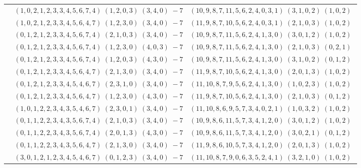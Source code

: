 \documentclass[11pt]{article}
\begin{document}
\begin{longtable}[l]{|c|c|c|}
 \cline{2-3} 
 & $(1 ,0 ,2 ,1 ,2 ,3 ,3 ,4 ,5 ,6 ,7 ,4) \;(1 ,2 ,0 ,3) \;(3 ,4 ,0) \;-7$ & $(10 ,9 ,8 ,7 ,11 ,5 ,6 ,2 ,4 ,0 ,3 ,1) \;(3 ,1 ,0 ,2) \;(1 ,0 ,2) \;$\\ 
 \cline{2-3} 
 & $(1 ,0 ,2 ,1 ,2 ,3 ,3 ,4 ,5 ,6 ,4 ,7) \;(1 ,2 ,3 ,0) \;(3 ,4 ,0) \;-7$ & $(11 ,9 ,8 ,7 ,10 ,5 ,6 ,2 ,4 ,0 ,3 ,1) \;(2 ,1 ,0 ,3) \;(1 ,0 ,2) \;$\\ 
 \cline{2-3} 
 & $(0 ,1 ,2 ,1 ,2 ,3 ,3 ,4 ,5 ,6 ,7 ,4) \;(2 ,1 ,0 ,3) \;(3 ,4 ,0) \;-7$ & $(10 ,9 ,8 ,7 ,11 ,5 ,6 ,2 ,4 ,1 ,3 ,0) \;(3 ,0 ,1 ,2) \;(1 ,0 ,2) \;$\\ 
 \cline{2-3} 
 & $(0 ,1 ,2 ,1 ,2 ,3 ,3 ,4 ,5 ,6 ,7 ,4) \;(1 ,2 ,3 ,0) \;(4 ,0 ,3) \;-7$ & $(10 ,9 ,8 ,7 ,11 ,5 ,6 ,2 ,4 ,1 ,3 ,0) \;(2 ,1 ,0 ,3) \;(0 ,2 ,1) \;$\\ 
 \cline{2-3} 
 & $(0 ,1 ,2 ,1 ,2 ,3 ,3 ,4 ,5 ,6 ,7 ,4) \;(1 ,2 ,0 ,3) \;(4 ,3 ,0) \;-7$ & $(10 ,9 ,8 ,7 ,11 ,5 ,6 ,2 ,4 ,1 ,3 ,0) \;(3 ,1 ,0 ,2) \;(0 ,1 ,2) \;$\\ 
 \cline{2-3} 
 & $(0 ,1 ,2 ,1 ,2 ,3 ,3 ,4 ,5 ,6 ,4 ,7) \;(2 ,1 ,3 ,0) \;(3 ,4 ,0) \;-7$ & $(11 ,9 ,8 ,7 ,10 ,5 ,6 ,2 ,4 ,1 ,3 ,0) \;(2 ,0 ,1 ,3) \;(1 ,0 ,2) \;$\\ 
 \cline{2-3} 
 & $(0 ,1 ,2 ,1 ,2 ,3 ,3 ,4 ,5 ,4 ,6 ,7) \;(2 ,3 ,1 ,0) \;(3 ,4 ,0) \;-7$ & $(11 ,10 ,8 ,7 ,9 ,5 ,6 ,2 ,4 ,1 ,3 ,0) \;(1 ,0 ,2 ,3) \;(1 ,0 ,2) \;$\\ 
 \cline{2-3} 
 & $(0 ,1 ,2 ,1 ,2 ,3 ,3 ,4 ,5 ,6 ,4 ,7) \;(1 ,2 ,3 ,0) \;(4 ,3 ,0) \;-7$ & $(11 ,9 ,8 ,7 ,10 ,5 ,6 ,2 ,4 ,1 ,3 ,0) \;(2 ,1 ,0 ,3) \;(0 ,1 ,2) \;$\\ 
 \cline{2-3} 
 & $(1 ,0 ,1 ,2 ,2 ,3 ,4 ,3 ,5 ,4 ,6 ,7) \;(2 ,3 ,0 ,1) \;(3 ,4 ,0) \;-7$ & $(11 ,10 ,8 ,6 ,9 ,5 ,7 ,3 ,4 ,0 ,2 ,1) \;(1 ,0 ,3 ,2) \;(1 ,0 ,2) \;$\\ 
 \cline{2-3} 
 & $(0 ,1 ,1 ,2 ,2 ,3 ,4 ,3 ,5 ,6 ,7 ,4) \;(2 ,1 ,0 ,3) \;(3 ,4 ,0) \;-7$ & $(10 ,9 ,8 ,6 ,11 ,5 ,7 ,3 ,4 ,1 ,2 ,0) \;(3 ,0 ,1 ,2) \;(1 ,0 ,2) \;$\\ 
 \cline{2-3} 
 & $(0 ,1 ,1 ,2 ,2 ,3 ,4 ,3 ,5 ,6 ,7 ,4) \;(2 ,0 ,1 ,3) \;(4 ,3 ,0) \;-7$ & $(10 ,9 ,8 ,6 ,11 ,5 ,7 ,3 ,4 ,1 ,2 ,0) \;(3 ,0 ,2 ,1) \;(0 ,1 ,2) \;$\\ 
 \cline{2-3} 
 & $(0 ,1 ,1 ,2 ,2 ,3 ,4 ,3 ,5 ,6 ,4 ,7) \;(2 ,1 ,3 ,0) \;(3 ,4 ,0) \;-7$ & $(11 ,9 ,8 ,6 ,10 ,5 ,7 ,3 ,4 ,1 ,2 ,0) \;(2 ,0 ,1 ,3) \;(1 ,0 ,2) \;$\\ 
 \cline{2-3} 
 & $(3 ,0 ,1 ,2 ,1 ,2 ,3 ,4 ,5 ,4 ,6 ,7) \;(0 ,1 ,2 ,3) \;(3 ,4 ,0) \;-7$ & $(11 ,10 ,8 ,7 ,9 ,0 ,6 ,3 ,5 ,2 ,4 ,1) \;(3 ,2 ,1 ,0) \;(1 ,0 ,2) \;$\\ 

\end{longtable}
\end{document}
